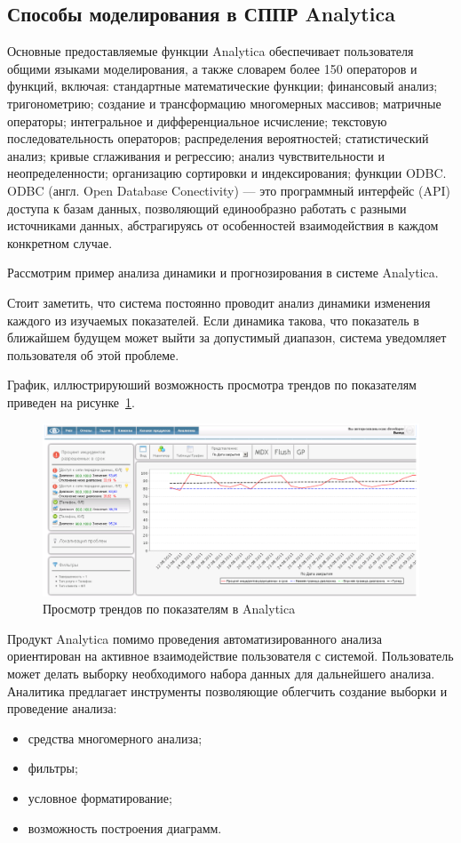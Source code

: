 \subsection{Способы моделирования в СППР Analytica}

Основные предоставляемые функции Analytica обеспечивает пользователя общими
языками моделирования, а также словарем более 150 операторов и функций,
включая: стандартные математические функции; финансовый анализ; тригонометрию;
создание и трансформацию многомерных массивов; матричные операторы;
интегральное и дифференциальное исчисление; текстовую последовательность
операторов; распределения вероятностей; статистический анализ; кривые сглаживания
и регрессию; анализ чувствительности и неопределенности; организацию сортировки
и индексирования; функции ODBC. ODBC (англ. Open Database Conectivity) --- это
программный интерфейс (API) доступа к базам данных, позволяющий единообразно
работать с разными источниками данных, абстрагируясь от особенностей взаимодействия
в каждом конкретном случае.

Рассмотрим пример анализа динамики и прогнозирования в системе Analytica.

Стоит заметить, что система постоянно проводит анализ динамики изменения
каждого из изучаемых показателей. Если динамика такова, что показатель
в ближайшем будущем может выйти за допустимый диапазон,
система уведомляет пользователя об этой проблеме.

График, иллюстрируюший возможность просмотра трендов по показателям приведен
на рисунке~\ref{fig:trends}.
\begin{figure}[h]
  \centering
  \includegraphics[scale=0.18]{fig/trends}
  \caption{Просмотр трендов по показателям в Analytica}
  \label{fig:trends}
\end{figure}

\pagebreak

Продукт Analytica помимо проведения автоматизированного анализа ориентирован
на активное взаимодействие пользователя с системой. Пользователь может делать
выборку необходимого набора данных для дальнейшего анализа. Аналитика предлагает
инструменты позволяющие облегчить создание выборки и проведение анализа:
\begin{itemize}
  \item средства многомерного анализа;
  \item фильтры;
  \item условное форматирование;
  \item возможность построения диаграмм.
\end{itemize}

